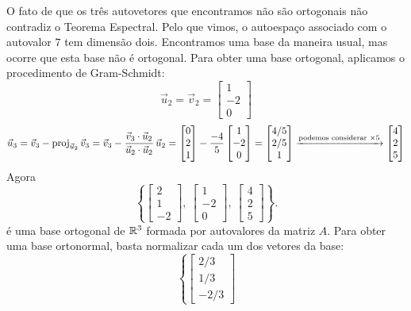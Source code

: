 \documentclass[../livro.tex]{subfiles}
\begin{document}
\begin{example}
	O fato de que os três autovetores que encontramos não são ortogonais não contradiz o Teorema Espectral. Pelo que vimos, o autoespaço associado com o autovalor $7$ tem dimensão dois. Encontramos uma base da maneira usual, mas ocorre que esta base não é ortogonal. Para obter uma base ortogonal, aplicamos o procedimento de Gram-Schmidt:
	\[
	\vec{u}_2 = \vec{v}_2 = 
	\begin{bmatrix}
	1 \\ -2 \\ 0
	\end{bmatrix}
	\]
	\[
	\vec{u}_3 = \vec{v}_3 - \operatorname{proj}_{\vec{u}_2} \vec{v}_3 = \vec{v}_3 - \frac{\vec{v}_3 \cdot \vec{u}_2}{\vec{u}_2 \cdot \vec{u}_2} \, \vec{u}_2 = 
	\begin{bmatrix}
	0 \\ 2 \\ 1
	\end{bmatrix} - \frac{-4}{5}
	\begin{bmatrix}
	1 \\ -2 \\ 0
	\end{bmatrix} = 
	\begin{bmatrix}
	4/5 \\ 2/5 \\ 1
	\end{bmatrix} \xrightarrow{\text{podemos considerar } \times 5}
	\begin{bmatrix}
	4 \\ 2 \\ 5
	\end{bmatrix}
	\] Agora
	\[
	\left\lbrace
	\begin{bmatrix}
	2 \\ 1 \\ -2
	\end{bmatrix}, \
	\begin{bmatrix}
	1 \\ -2 \\ 0
	\end{bmatrix}, \
	\begin{bmatrix}
	4 \\ 2 \\ 5
	\end{bmatrix}
	\right\rbrace.
	\] é uma base ortogonal de $\mathbb{R}^3$ formada por autovalores da matriz $A$. Para obter uma base ortonormal, basta normalizar cada um dos vetores da base:
	\[
	\left\lbrace
	\begin{bmatrix}
	2/3 \\ 1/3 \\ -2/3

\end{bmatrix}\]
\end{example}
\end{document}
